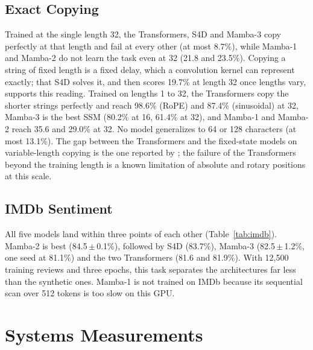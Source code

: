 \documentclass[conference]{IEEEtran}
\newcommand{\mamba}{Mamba}
\begin{document}
\subsection{Exact Copying}
\begin{table}[t]
\centering
\caption{Exact copying: token accuracy (\%) by string length, trained at the
single length 32 (top) or on lengths 1 to 32 (bottom).}
\label{tab:exact}

\par\vspace{10pt}

\end{table}
Trained at the single length 32, the Transformers, S4D and \mamba{}-3 copy
perfectly at that length and fail at every other (at most 8.7\%), while
\mamba{}-1 and \mamba{}-2 do not learn the task even at 32 (21.8 and
23.5\%). Copying a string of fixed length is a fixed delay, which a
convolution kernel can represent exactly; that S4D solves it, and then
scores 19.7\% at length 32 once lengths vary, supports this reading.
Trained on lengths 1 to 32, the Transformers copy the shorter strings
perfectly and reach 98.6\% (RoPE) and 87.4\% (sinusoidal) at 32, \mamba{}-3
is the best SSM (80.2\% at 16, 61.4\% at 32), and \mamba{}-1 and \mamba{}-2
reach 35.6 and 29.0\% at 32. No model generalizes to 64 or 128 characters
(at most 13.1\%). The gap between the Transformers and the fixed-state models
on variable-length copying is the one reported by \cite{jelassi2024repeat};
the failure of the Transformers beyond the training length is a known
limitation of absolute and rotary positions at this scale.

\subsection{IMDb Sentiment}
\begin{table}[t]
\centering
\caption{IMDb: test accuracy (\%) on the 25k test split.}
\label{tab:imdb}
\small

\end{table}
All five models land within three points of each other
(Table~\ref{tab:imdb}). \mamba{}-2 is best (84.5\,$\pm$\,0.1\%), followed
by S4D (83.7\%), \mamba{}-3 (82.5\,$\pm$\,1.2\%, one seed at 81.1\%) and
the two Transformers (81.6 and 81.9\%). With 12{,}500 training reviews and
three epochs, this task separates the architectures far less than the
synthetic ones. \mamba{}-1 is not trained on IMDb because its sequential
scan over 512 tokens is too slow on this GPU.

\section{Systems Measurements}
\label{sec:systems}
\end{document}
